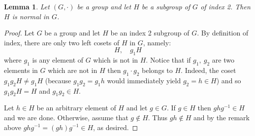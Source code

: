 \documentclass[12pt]{article}
\newtheorem*{lemma}{Lemma}
\theoremstyle{definition}
\begin{document}
\begin{lemma}
Let $(G,\cdot)$ be a group and let $H$ be a subgroup of $G$ of index 2. Then $H$ is normal in $G$.
\end{lemma}
\begin{proof}
Let $G$ be a group and let $H$ be an index 2 subgroup of $G$. By definition of index, there are only two left cosets of $H$ in $G$, namely:
$$H, \quad g_1H$$
where $g_1$ is any element of $G$ which is not in $H$. Notice that if $g_1,\ g_2$ are two elements in $G$ which are not in $H$ then $g_1\cdot g_2$ belongs to $H$. Indeed, the coset $g_1g_2H\neq g_1H$ (because $g_1g_2=g_1h$ would immediately yield $g_2=h\in H$) and so $g_1g_2H=H$ and $g_1g_2\in H$.

Let $h\in H$ be an arbitrary element of $H$ and let $g\in G$. If $g\in H$ then $ghg^{-1}\in H$ and we are done. Otherwise, assume that $g\notin H$. Thus $gh\notin H$ and by the remark above $ghg^{-1}=(gh)g^{-1} \in H$, as desired.
\end{proof}
\end{document}

